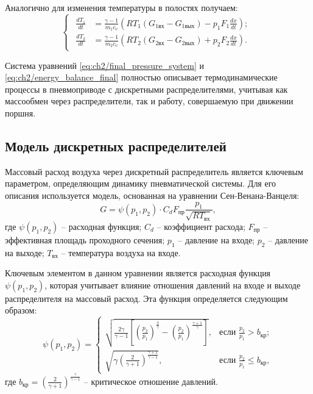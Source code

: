 Аналогично для изменения температуры в полостях получаем:
\begin{equation}
	\label{eq:ch2/energy_balance_final}
	\begin{cases}
		\begin{aligned}
			\frac{dT_1}{dt} & = \frac{\gamma-1}{m_1c_v}\left(RT_1(G_{1\text{вх}} - G_{1\text{вых}}) - p_1F_1\frac{dx}{dt}\right); \\
			\frac{dT_2}{dt} & = \frac{\gamma-1}{m_2c_v}\left(RT_2(G_{2\text{вх}} - G_{2\text{вых}}) + p_2F_2\frac{dx}{dt}\right).
		\end{aligned}
	\end{cases}
\end{equation}

Система уравнений \eqref{eq:ch2/final_pressure_system} и \eqref{eq:ch2/energy_balance_final} полностью
описывает термодинамические процессы в пневмоприводе с дискретными распределителями, учитывая как массообмен
через распределители, так и работу, совершаемую при движении поршня.


\subsection*{Модель дискретных распределителей}
Массовый расход воздуха через дискретный распределитель
является ключевым параметром, определяющим динамику пневматической
системы. Для его описания используется модель, основанная на уравнении Сен-Венана-Ванцеля:
\begin{equation}
	G = \psi(p_1, p_2) \cdot C_d F_\text{пр} \frac{p_1}{\sqrt{RT_\text{вх}}},
\end{equation}
где
$\psi(p_1, p_2)$ -- расходная функция;
$C_d$ -- коэффициент расхода;
$F_\text{пр}$ -- эффективная площадь проходного сечения;
$p_1$ -- давление на входе;
$p_2$ -- давление на выходе;
$T_\text{вх}$ -- температура воздуха на входе.

Ключевым элементом в данном уравнении является расходная функция $\psi(p_1, p_2)$, которая
учитывает влияние отношения давлений на входе и выходе распределителя
на массовый расход. Эта функция определяется следующим образом:
\begin{equation}
	\psi(p_1, p_2) = \begin{cases}
		\sqrt{\frac{2\gamma}{\gamma-1}\left[\left(\frac{p_2}{p_1}\right)^{\frac{2}{\gamma}} - \left(\frac{p_2}{p_1}\right)^{\frac{\gamma+1}{\gamma}}\right]}, & \text{если } \frac{p_2}{p_1} > b_{кр};    \\
		\sqrt{\gamma \left(\frac{2}{\gamma+1}\right)^{\frac{\gamma+1}{\gamma-1}}},                                                                            & \text{если } \frac{p_2}{p_1} \leq b_{кр},
	\end{cases}
\end{equation}
где
$b_{кр} = \left(\frac{2}{\gamma+1}\right)^{\frac{\gamma}{\gamma-1}}$ -- критическое отношение давлений.

